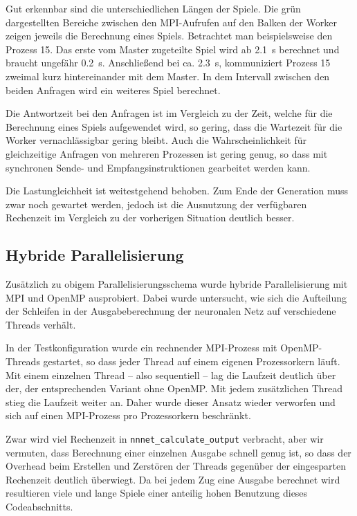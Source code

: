 Gut erkennbar sind die unterschiedlichen Längen der Spiele. Die grün
dargestellten Bereiche zwischen den MPI-Aufrufen auf den Balken der Worker
zeigen jeweils die Berechnung eines Spiels. Betrachtet man beispielsweise den
Prozess 15. Das erste vom Master zugeteilte Spiel wird ab \SI{2,1}{\second}
berechnet und braucht ungefähr \SI{0,2}{\second}. Anschließend bei ca.
\SI{2,3}{\second}, kommuniziert Prozess 15 zweimal kurz hintereinander mit dem
Master. In dem Intervall zwischen den beiden Anfragen wird ein weiteres Spiel
berechnet.

Die Antwortzeit bei den Anfragen ist im Vergleich zu der Zeit, welche für die
Berechnung eines Spiels aufgewendet wird, so gering, dass die Wartezeit für die
Worker vernachlässigbar gering bleibt. Auch die Wahrscheinlichkeit für
gleichzeitige Anfragen von mehreren Prozessen ist gering genug, so dass mit
synchronen Sende- und Empfangsinstruktionen gearbeitet werden kann.

Die Lastungleichheit ist weitestgehend behoben. Zum Ende der Generation muss
zwar noch gewartet werden, jedoch ist die Ausnutzung der verfügbaren Rechenzeit
im Vergleich zu der vorherigen Situation deutlich besser.

\subsection{Hybride Parallelisierung}
Zusätzlich zu obigem Parallelisierungsschema wurde hybride Parallelisierung mit
MPI und OpenMP ausprobiert.  Dabei wurde untersucht, wie sich die Aufteilung
der Schleifen in der Ausgabeberechnung der neuronalen Netz auf
verschiedene Threads verhält.

In der Testkonfiguration wurde ein rechnender MPI-Prozess mit OpenMP-Threads
gestartet, so dass jeder Thread auf einem eigenen Prozessorkern läuft.  Mit
einem einzelnen Thread -- also sequentiell -- lag die Laufzeit deutlich über
der, der entsprechenden Variant ohne OpenMP.  Mit jedem zusätzlichen Thread
stieg die Laufzeit weiter an. Daher wurde dieser Ansatz wieder verworfen und
sich auf einen MPI-Prozess pro Prozessorkern beschränkt.

Zwar wird viel Rechenzeit in \texttt{nnnet\_calculate\_output} verbracht, aber
wir vermuten, dass Berechnung einer einzelnen Ausgabe schnell genug ist, so
dass der Overhead beim Erstellen und Zerstören der Threads gegenüber der
eingesparten Rechenzeit deutlich überwiegt. Da bei jedem Zug eine Ausgabe
berechnet wird resultieren viele und lange Spiele einer anteilig hohen
Benutzung dieses Codeabschnitts.
